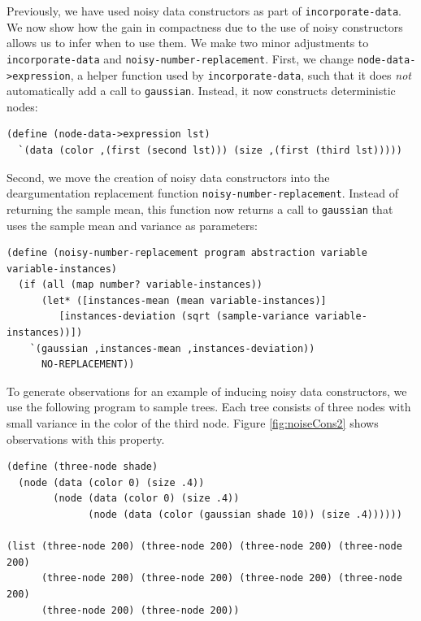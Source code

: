 \documentclass[a4paper,10pt]{article}
\begin{document}
Previously, we have used noisy data constructors as part of \texttt{incorporate-data}. We now show how the gain in compactness due to the use of noisy constructors allows us to infer when to use them. We make two minor adjustments to \texttt{incorporate-data} and \texttt{noisy-number-replacement}. First, we change \texttt{node-data->expression}, a helper function used by \texttt{incorporate-data}, such that it does \textit{not} automatically add a call to \texttt{gaussian}. Instead, it now constructs deterministic nodes:
\begin{lstlisting}[frame=trblsingle]
(define (node-data->expression lst)
  `(data (color ,(first (second lst))) (size ,(first (third lst)))))
\end{lstlisting}
Second, we move the creation of noisy data constructors into the deargumentation replacement function \texttt{noisy-number-replacement}. Instead of returning the sample mean, this function now returns a call to \texttt{gaussian} that uses the sample mean and variance as parameters:
\begin{lstlisting}[frame=trblsingle]
(define (noisy-number-replacement program abstraction variable variable-instances)
  (if (all (map number? variable-instances))
      (let* ([instances-mean (mean variable-instances)]
	     [instances-deviation (sqrt (sample-variance variable-instances))])
	`(gaussian ,instances-mean ,instances-deviation))
      NO-REPLACEMENT))
\end{lstlisting}


To generate observations for an example of inducing noisy data constructors, we use the following program to sample trees. Each tree consists of three nodes with small variance in the color of the third node. Figure \ref{fig:noiseCons2} shows observations with this property.
\begin{lstlisting}[mathescape=true]
(define (three-node shade)
  (node (data (color 0) (size .4))
        (node (data (color 0) (size .4)) 
              (node (data (color (gaussian shade 10)) (size .4))))))

(list (three-node 200) (three-node 200) (three-node 200) (three-node 200)
      (three-node 200) (three-node 200) (three-node 200) (three-node 200)
      (three-node 200) (three-node 200))
\end{lstlisting}
\end{document}
